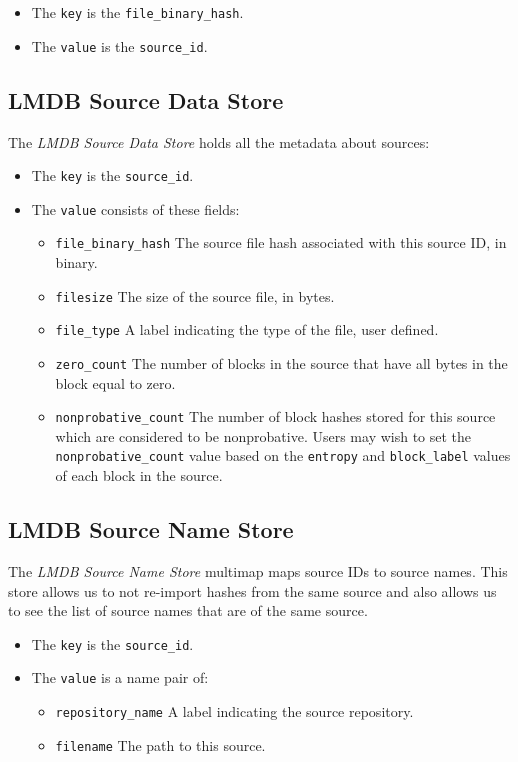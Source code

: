 \documentclass[11pt,fleqn]{article} %
\begin{document}
\begin{itemize}
\item The \verb+key+ is the \verb+file_binary_hash+.
\item The \verb+value+ is the \verb+source_id+.
\end{itemize}

\subsection{LMDB Source Data Store}
The \textit{LMDB Source Data Store} holds all the metadata about sources:
\begin{itemize}
\item The \verb+key+ is the \verb+source_id+.
\item The \verb+value+ consists of these fields:
  \begin{itemize}
  \item \verb+file_binary_hash+ The source file hash associated with this source ID, in binary.
  \item \verb+filesize+ The size of the source file, in bytes.
  \item \verb+file_type+ A label indicating the type of the file, user defined.
  \item \verb+zero_count+ The number of blocks in the source that have all bytes in the block equal to zero.
  \item \verb+nonprobative_count+ The number of block hashes stored for this source which are considered to be nonprobative.  Users may wish to set the \verb+nonprobative_count+ value based on the \verb+entropy+ and \verb+block_label+ values of each block in the source.
  \end{itemize}
\end{itemize}

\subsection{LMDB Source Name Store}
The \textit{LMDB Source Name Store} multimap maps source IDs to source names.  This store allows us to not re-import hashes from the same source and also allows us to see the list of source names that are of the same source.
\begin{itemize}
\item The \verb+key+ is the \verb+source_id+.
\item The \verb+value+ is a name pair of:
  \begin{itemize}
  \item \verb+repository_name+ A label indicating the source repository.
  \item \verb+filename+ The path to this source.
  \end{itemize}
\end{itemize}
\end{document}
